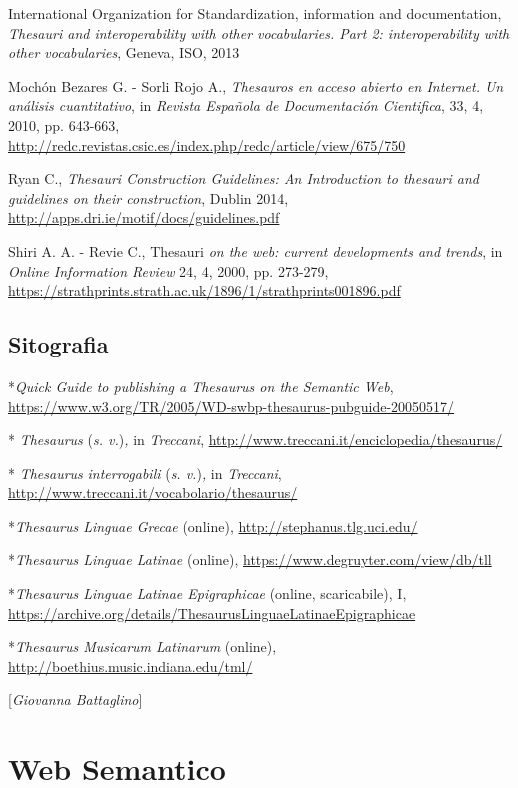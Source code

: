 {{International Organization for Standardization, information and
documentation, \emph{Thesauri and interoperability with other
vocabularies. Part 2: interoperability with other vocabularies}, Geneva,
ISO, 2013

Mochón Bezares G. - Sorli Rojo A., \emph{Thesauros en acceso abierto en
Internet. Un análisis cuantitativo}, in \emph{Revista Española de
Documentación Cientifica}, 33, 4, 2010, pp. 643-663,
\url{http://redc.revistas.csic.es/index.php/redc/article/view/675/750}

Ryan C., \emph{Thesauri Construction Guidelines: An Introduction to
thesauri and guidelines on their construction}, Dublin 2014,
\url{http://apps.dri.ie/motif/docs/guidelines.pdf}

Shiri A. A. - Revie C., Thesauri \emph{on the web: current developments
and trends}, in \emph{Online Information Review} 24, 4, 2000, pp.
273-279,
\url{https://strathprints.strath.ac.uk/1896/1/strathprints001896.pdf}

}

\section*{Sitografia}
{\parindent0pt 
*\emph{Quick Guide to publishing a Thesaurus on the Semantic Web},
\url{https://www.w3.org/TR/2005/WD-swbp-thesaurus-pubguide-20050517/}

* \emph{Thesaurus} (\emph{s. v.})\emph{,} in \emph{Treccani},
\url{http://www.treccani.it/enciclopedia/thesaurus/}

* \emph{Thesaurus} \emph{interrogabili} (\emph{s. v.})\emph{,} in
\emph{Treccani},
\url{http://www.treccani.it/vocabolario/thesaurus/}

*\emph{Thesaurus Linguae Grecae} (online),
\url{http://stephanus.tlg.uci.edu/}

*\emph{Thesaurus Linguae Latinae} (online),
\url{https://www.degruyter.com/view/db/tll}

*\emph{Thesaurus Linguae Latinae Epigraphicae} (online, scaricabile), I,
\url{https://archive.org/details/ThesaurusLinguaeLatinaeEpigraphicae}

*\emph{Thesaurus Musicarum Latinarum} (online),
\url{http://boethius.music.indiana.edu/tml/}
}

\hrulefill 
 
{[}\emph{Giovanna Battaglino}{]}




\chapter{Web Semantico}

}
